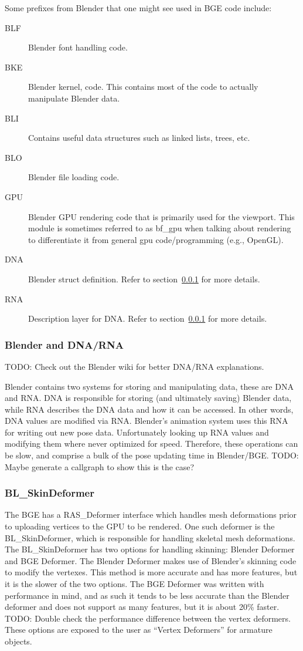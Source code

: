 \documentclass[10pt]{article}
\newcommand{\todo}[1] {{\color{todo} TODO: #1}}
\begin{document}
Some prefixes from Blender that one might see used in BGE code include:

\begin{description}
 \item [BLF] Blender font handling code.
 \item [BKE] Blender kernel, code. This contains most of the code to actually manipulate Blender data.
 \item [BLI] Contains useful data structures such as linked lists, trees, etc.
 \item [BLO] Blender file loading code.
 \item [GPU] Blender GPU rendering code that is primarily used for the viewport. This module is sometimes referred to as bf\_gpu when talking about rendering to differentiate it from general gpu code/programming (e.g., OpenGL).
 \item [DNA] Blender struct definition. Refer to section~\ref{sec:bf_dna_rna} for more details.
 \item [RNA] Description layer for DNA. Refer to section~\ref{sec:bf_dna_rna} for more details.
\end{description}

\subsubsection{Blender and DNA/RNA}
\label{sec:bf_dna_rna}
\todo{Check out the Blender wiki for better DNA/RNA explanations.}

Blender contains two systems for storing and manipulating data, these are DNA and RNA. DNA is responsible for storing (and ultimately saving) Blender data, while RNA describes the DNA data and how it can be accessed. In other words, DNA values are modified via RNA. Blender's animation system uses this RNA for writing out new pose data. Unfortunately looking up RNA values and modifying them where never optimized for speed. Therefore, these operations can be slow, and comprise a bulk of the pose updating time in Blender/BGE. \todo{Maybe generate a callgraph to show this is the case?}

\subsubsection{BL\_SkinDeformer}
\label{sec:bl_skindeformer}
The BGE has a RAS\_Deformer interface which handles mesh deformations prior to uploading vertices to the GPU to be rendered. One such deformer is the BL\_SkinDeformer, which is responsible for handling skeletal mesh deformations. The BL\_SkinDeformer has two options for handling skinning: Blender Deformer and BGE Deformer. The Blender Deformer makes use of Blender's skinning code to modify the vertexes. This method is more accurate and has more features, but it is the slower of the two options. The BGE Deformer was written with performance in mind, and as such it tends to be less accurate than the Blender deformer and does not support as many features, but it is about 20\% faster. \todo{Double check the performance difference between the vertex deformers.} These options are exposed to the user as ``Vertex Deformers'' for armature objects.
\end{document}
